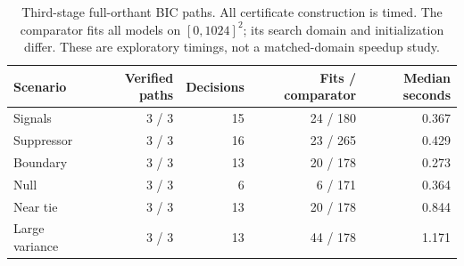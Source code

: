 \begin{table}[H]\centering\small
\begin{tabular}{lrrrr}
\toprule
Scenario & Verified paths & Decisions & Fits / comparator & Median seconds \\
\midrule
Signals & 3 / 3 & 15 & 24 / 180 & 0.367 \\
Suppressor & 3 / 3 & 16 & 23 / 265 & 0.429 \\
Boundary & 3 / 3 & 13 & 20 / 178 & 0.273 \\
Null & 3 / 3 & 6 & 6 / 171 & 0.364 \\
Near tie & 3 / 3 & 13 & 20 / 178 & 0.844 \\
Large variance & 3 / 3 & 13 & 44 / 178 & 1.171 \\
\bottomrule
\end{tabular}
\caption{Third-stage full-orthant BIC paths. All certificate construction is timed. The comparator fits all models on $[0,1024]^2$; its search domain and initialization differ. These are exploratory timings, not a matched-domain speedup study.}
\end{table}
